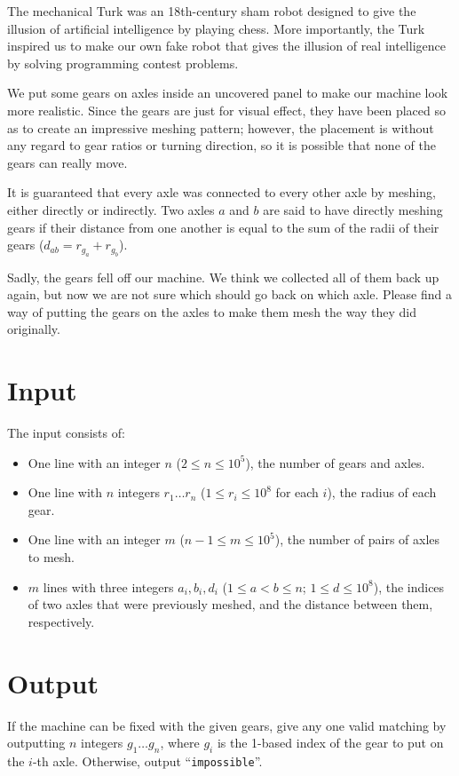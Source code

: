 %
The mechanical Turk was an 18th-century sham robot designed to give the
illusion of artificial intelligence by playing chess. More importantly, the Turk
inspired us to make our own fake robot that gives the illusion of real
intelligence by solving programming contest problems.

We put some gears on axles inside an uncovered panel to make our machine look
more realistic. Since the gears are just for visual effect, they have been
placed so as to create an impressive meshing pattern; however, the placement
is without any regard to gear ratios or turning direction, so it is possible that
none of the gears can really move.

It is guaranteed that every axle was connected to every other axle by meshing,
either directly or indirectly. Two axles $a$ and $b$ are said to have directly
meshing gears if their distance from one another is equal to the sum of the
radii of their gears ($d_{ab} = r_{g_a} + r_{g_b}$).

Sadly, the gears fell off our machine. We think we collected all of them back up
again, but now we are not sure which should go back on which axle. Please find a
way of putting the gears on the axles to make them mesh the way they did
originally.

\section*{Input}
The input consists of:
\begin{itemize}
	\item One line with an integer $n$ ($2 \le n \le 10^5$), the number of gears and axles.
	\item One line with $n$ integers $r_1 \ldots r_n$ ($1 \le r_i \le 10^8$ for each $i$), the radius of each gear.
	\item One line with an integer $m$ ($n-1 \le m \le 10^5$), the number of pairs of axles to mesh.
	\item $m$ lines with three integers $a_i, b_i, d_i$
($1 \le a < b \le n$; $1 \le d \le 10^8$), the indices of two axles that were previously meshed,
and the distance between them, respectively.
\end{itemize}

\section*{Output}

If the machine can be fixed with the given gears, give any one valid matching
by outputting $n$ integers $g_1{\ldots}g_n$, where $g_i$ is the 1-based index of the gear
to put on the $i$-th axle. Otherwise, output ``\texttt{impossible}''.
